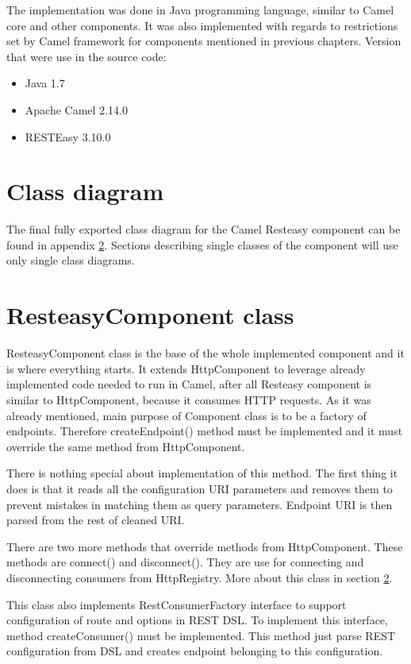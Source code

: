 \documentclass[12pt,final,oneside]{fithesis2}
\begin{document}
The implementation was done in Java programming language, similar to Camel core and other components. It was also implemented with regards to restrictions set by Camel framework for components mentioned in previous chapters. Version that were use in the source code:
\begin{itemize}
\item
Java 1.7

\item
Apache Camel 2.14.0

\item
RESTEasy 3.10.0
\end{itemize}

\section{Class diagram}
The final fully exported class diagram for the Camel Resteasy component can be found in appendix \ref{}. Sections describing single classes of the component will use only single class diagrams.

\section{ResteasyComponent class}
ResteasyComponent class is the base of the whole implemented component and it is where everything starts. It extends HttpComponent to leverage already implemented code needed to run in Camel, after all Resteasy component is similar to HttpComponent, because it consumes HTTP requests. As it was already mentioned, main purpose of Component class is to be a factory of endpoints. Therefore createEndpoint() method must be implemented and it must override the same method from HttpComponent.

There is nothing special about implementation of this method. The first thing it does is that it reads all the configuration URI parameters and removes them to prevent mistakes in matching them as query parameters. Endpoint URI is then parsed from the rest of cleaned URI.

There are two more methods that override methods from HttpComponent. These methods are connect() and disconnect(). They are use for connecting and disconnecting consumers from HttpRegistry. More about this class in section \ref{}. 

This class also implements RestConsumerFactory interface to support configuration of route and options in REST DSL. To implement this interface, method createConsumer() must be implemented. This method just parse REST configuration from DSL and creates endpoint belonging to this configuration.
\end{document}
